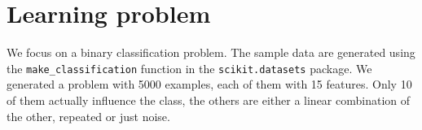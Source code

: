 \section{Learning problem}
\label{sec:learning_problem}

We focus on a binary classification problem.
The sample data are generated using the \texttt{make\_classification} function in the \texttt{scikit.datasets} package.
We generated a problem with \num{5000} examples, each of them with \num{15} features.
Only \num{10} of them actually influence the class, the others are either a linear combination of the other, repeated or just noise.
